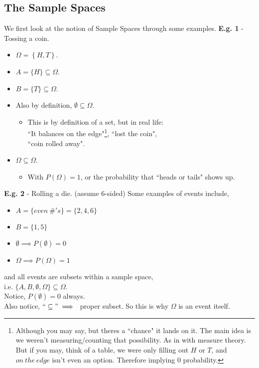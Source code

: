 \documentclass[12pt]{book}
\begin{document}
\subsection{The Sample Spaces}
We first look at the notion of Sample Spaces through some examples.
\textbf{E.g. 1} - Tossing a coin.
\begin{itemize}
\item$\Omega=\left\{ H,T \right\}$.
\item$A=\{H\}\subseteq \Omega$.
\item$B=\{T\}\subseteq \Omega$.
\item Also by definition, $\emptyset \subseteq \Omega$.
\begin{itemize}
\item This is by definition of a set, but in real life:\\``It balances on the edge"\footnote{Although you may say, but theres a ``chance" it lands on it. The main idea is we weren't measuring/counting that possibility. As in with measure theory. But if you may, think of a table, we were only filling out $H$ or $T$, and $on~the~edge$ isn't even an option. Therefore implying 0 probability.}, ``lost the coin", \\``coin rolled away".
\end{itemize}
\item $\Omega \subseteq \Omega$.
\begin{itemize}
\item With $P(\Omega)=1$, or the probability that ``heads or tails" shows up. 
\end{itemize}
\end{itemize}

\noindent\textbf{E.g. 2} - Rolling a die. (assume 6-sided)
Some examples of events include, 
\begin{itemize}
\item $A = \{ even~\#'s \} = \{ 2,4,6 \}$
\item $B = \{ 1,5 \}$
\item $\emptyset \implies P(\emptyset) = 0$
\item$\Omega \implies P(\Omega) = 1$
\end{itemize}
and all events are subsets within a sample space,\\
i.e. $\{ A,B,\emptyset, \Omega \} \subseteq \Omega$.\\

\noindent Notice, $P(\emptyset)=0$ always. \\
Also notice, $``\subseteq" \implies{}$ proper subset. So this is why $\Omega$ is an event itself.
\end{document}
